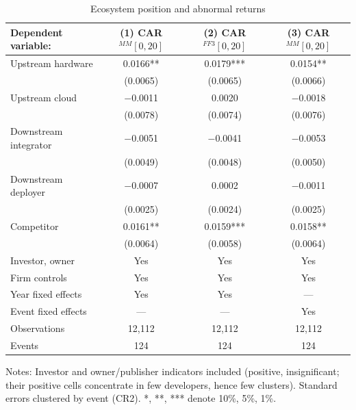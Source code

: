 \documentclass[review,12pt,authoryear]{elsarticle}
\begin{document}
\begin{table}[t!]
\centering
\begin{threeparttable}
\caption{Ecosystem position and abnormal returns}\label{tab:position}
\small
\begin{tabular}{lccc}
\toprule
Dependent variable: & (1) CAR$^{MM}[0,20]$ & (2) CAR$^{FF3}[0,20]$ & (3) CAR$^{MM}[0,20]$ \\
\midrule
Upstream hardware      & 0.0166** & 0.0179*** & 0.0154** \\
                       & (0.0065) & (0.0065)  & (0.0066) \\
Upstream cloud         & $-$0.0011 & 0.0020   & $-$0.0018 \\
                       & (0.0078) & (0.0074)  & (0.0076) \\
Downstream integrator  & $-$0.0051 & $-$0.0041 & $-$0.0053 \\
                       & (0.0049) & (0.0048)  & (0.0050) \\
Downstream deployer    & $-$0.0007 & 0.0002   & $-$0.0011 \\
                       & (0.0025) & (0.0024)  & (0.0025) \\
Competitor             & 0.0161** & 0.0159*** & 0.0158** \\
                       & (0.0064) & (0.0058)  & (0.0064) \\
\midrule
Investor, owner        & Yes & Yes & Yes \\
Firm controls          & Yes & Yes & Yes \\
Year fixed effects     & Yes & Yes & --- \\
Event fixed effects    & --- & --- & Yes \\
Observations           & 12{,}112 & 12{,}112 & 12{,}112 \\
Events                 & 124 & 124 & 124 \\
\bottomrule
\end{tabular}
\begin{tablenotes}\footnotesize
\item Notes: Investor and owner/publisher indicators included (positive,
insignificant; their positive cells concentrate in few developers, hence few
clusters). Standard errors clustered by event (CR2). *, **, *** denote
10\%, 5\%, 1\%.
\end{tablenotes}
\end{threeparttable}
\end{table}
\end{document}

